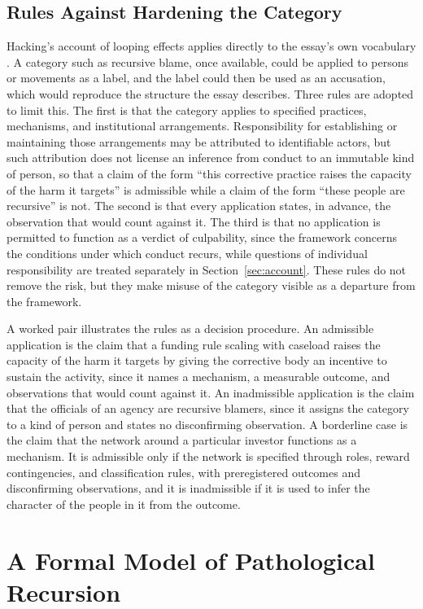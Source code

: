\documentclass[12pt]{article}
\theoremstyle{remark}
\begin{document}
\subsection{Rules Against Hardening the Category}

Hacking's account of looping effects applies directly to the essay's own vocabulary \cite{hacking1995}. A category such as recursive blame, once available, could be applied to persons or movements as a label, and the label could then be used as an accusation, which would reproduce the structure the essay describes. Three rules are adopted to limit this. The first is that the category applies to specified practices, mechanisms, and institutional arrangements. Responsibility for establishing or maintaining those arrangements may be attributed to identifiable actors, but such attribution does not license an inference from conduct to an immutable kind of person, so that a claim of the form ``this corrective practice raises the capacity of the harm it targets'' is admissible while a claim of the form ``these people are recursive'' is not. The second is that every application states, in advance, the observation that would count against it. The third is that no application is permitted to function as a verdict of culpability, since the framework concerns the conditions under which conduct recurs, while questions of individual responsibility are treated separately in Section~\ref{sec:account}. These rules do not remove the risk, but they make misuse of the category visible as a departure from the framework.

A worked pair illustrates the rules as a decision procedure. An admissible application is the claim that a funding rule scaling with caseload raises the capacity of the harm it targets by giving the corrective body an incentive to sustain the activity, since it names a mechanism, a measurable outcome, and observations that would count against it. An inadmissible application is the claim that the officials of an agency are recursive blamers, since it assigns the category to a kind of person and states no disconfirming observation. A borderline case is the claim that the network around a particular investor functions as a mechanism. It is admissible only if the network is specified through roles, reward contingencies, and classification rules, with preregistered outcomes and disconfirming observations, and it is inadmissible if it is used to infer the character of the people in it from the outcome.

\section{A Formal Model of Pathological Recursion}
\label{sec:model}
\end{document}
